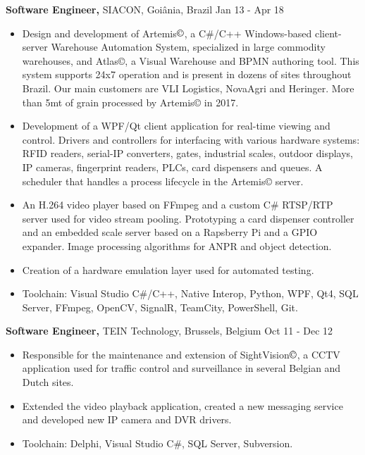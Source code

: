 \documentclass[margin]{res}
\begin{document}
\begin{resume}
 {\bf Software Engineer,} SIACON, Goiânia, Brazil \hfill Jan 13 - Apr 18
 \begin{itemize} \itemsep -2pt  %
 \item Design and development of Artemis$\copyright$, a C\#/C++ Windows-based client-server Warehouse Automation System, specialized in large commodity warehouses, and Atlas©, a Visual Warehouse and BPMN authoring tool. This system supports 24x7 operation and is present in dozens of sites throughout Brazil. Our main customers are VLI Logistics, NovaAgri and Heringer. More than 5mt of grain processed by Artemis© in 2017.
 \item Development of a WPF/Qt client application for real-time viewing and control. Drivers and controllers for interfacing with various hardware systems: RFID readers, serial-IP converters, gates, industrial scales, outdoor displays, IP cameras, fingerprint readers, PLCs, card dispensers and queues. A scheduler that handles a process lifecycle in the Artemis© server.
 \item An H.264 video player based on FFmpeg and a custom C\# RTSP/RTP server used for video stream pooling. Prototyping a card dispenser controller and an embedded scale server based on a Rapsberry Pi and a GPIO expander. Image processing algorithms for ANPR and object detection.
 \item Creation of a hardware emulation layer used for automated testing.
 \item Toolchain: Visual Studio C\#/C++, Native Interop, Python, WPF, Qt4, SQL Server, FFmpeg, OpenCV, SignalR, TeamCity, PowerShell, Git.
\end{itemize}

 {\bf Software Engineer,} TEIN Technology, Brussels, Belgium \hfill Oct 11 - Dec 12
 \begin{itemize} \itemsep -2pt  %
 \item Responsible for the maintenance and extension of SightVision$\copyright$, a CCTV application used for traffic control and surveillance in several Belgian and Dutch sites.
 \item Extended the video playback application, created a new messaging service and developed new IP camera and DVR drivers.
 \item Toolchain: Delphi, Visual Studio C\#, SQL Server, Subversion.
 \end{itemize}


\end{resume}
\end{document}
